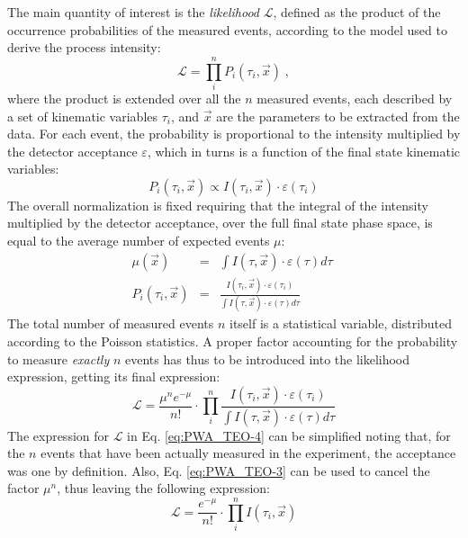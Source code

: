 \documentclass[a4paper,10pt]{report}
\begin{document}
The main quantity of interest is the \textit{likelihood} $\mathcal L$, defined as the product of the occurrence probabilities of the measured events, according to the model used to derive the process intensity:
\begin{equation}\label{eq:PWA_TEO-1}
\mathcal L=\prod_i^n P_i(\tau_i,\vec{x}) \; ,
\end{equation} 
where the product is extended over all the $n$ measured events, each described by a set of kinematic variables $\tau_i$, and $\vec{x}$ are the parameters to be extracted from the data. For each event, the probability is proportional to the intensity multiplied by the detector acceptance $\varepsilon$, which in turns is a function of the final state kinematic variables:
\begin{equation}\label{eq:PWA_TEO-2}
P_i(\tau_i,\vec{x}) \propto I(\tau_i,\vec{x}) \cdot \varepsilon(\tau_i)
\end{equation}
The overall normalization is fixed requiring that the integral of the intensity multiplied by the detector acceptance, over the full final state phase space, is equal to the average number of expected events $\mu$:
\begin{eqnarray}\label{eq:PWA_TEO-3}
\mu(\vec{x})&=&\int I(\tau,\vec{x}) \cdot \varepsilon(\tau) d\tau \;  \\
P_i(\tau_i,\vec{x}) &=&\frac{ I(\tau_i,\vec{x}) \cdot \varepsilon(\tau_i) } {\int I(\tau,\vec{x}) \cdot \varepsilon(\tau) d\tau}
\end{eqnarray}
The total number of measured events $n$ itself is a statistical variable, distributed according to the Poisson statistics. A proper factor accounting for the probability to measure \textit{exactly} $n$ events has thus to be introduced into the likelihood expression, getting its final expression:
\begin{equation}\label{eq:PWA_TEO-4}
\mathcal L=\frac{\mu^{n}e^{-\mu}}{n!}\cdot \prod_i^n \frac{ I(\tau_i,\vec{x}) \cdot \varepsilon(\tau_i) } {\int I(\tau,\vec{x}) \cdot \varepsilon(\tau) d\tau}
\end{equation}
The expression for $\mathcal{L}$ in Eq. \ref{eq:PWA_TEO-4} can be simplified noting that, for the $n$ events that have been actually measured in the experiment, the acceptance was one by definition. Also, Eq. \ref{eq:PWA_TEO-3} can be used to cancel the factor $\mu^{n}$, thus leaving the following expression:
\begin{equation}\label{eq:PWA_TEO-5}
\mathcal L=\frac{e^{-\mu}}{n!}\cdot \prod_i^n  I(\tau_i,\vec{x})
\end{equation}
\end{document}
